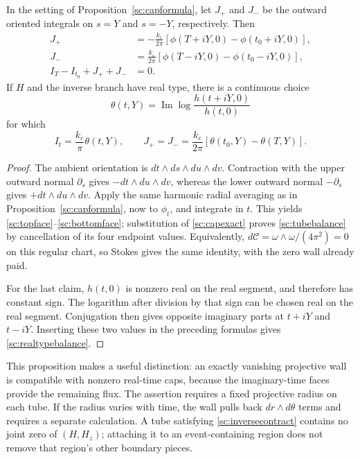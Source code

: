 \begin{proposition}
\label{sc:closedtube}
In the setting of Proposition~\ref{sc:capformula}, let $J_+$ and $J_-$
be the outward oriented integrals on $s=Y$ and $s=-Y$, respectively.
Then
\begin{align}
 J_+&=-\frac{k_\varepsilon}{2\pi}
       [\phi(T+iY,0)-\phi(t_0+iY,0)],
 \label{sc:topface}\\
 J_-&=\frac{k_\varepsilon}{2\pi}
       [\phi(T-iY,0)-\phi(t_0-iY,0)],
 \label{sc:bottomface}\\
 I_T-I_{t_0}+J_++J_-&=0.
 \label{sc:tubebalance}
\end{align}
If $H$ and the inverse branch have real type, there is a continuous
choice
\[
 \theta(t,Y)=\operatorname{Im}\log
          \frac{h(t+iY,0)}{h(t,0)}
\]
for which
\begin{equation}
 I_t=\frac{k_\varepsilon}{\pi}\theta(t,Y),\qquad
 J_+=J_-=\frac{k_\varepsilon}{2\pi}
           [\theta(t_0,Y)-\theta(T,Y)].
 \label{sc:realtypebalance}
\end{equation}
\end{proposition}

\begin{proof}
The ambient orientation is $dt\wedge ds\wedge du\wedge dv$.
Contraction with the upper outward normal $\partial_s$ gives
$-dt\wedge du\wedge dv$, whereas the lower outward normal
$-\partial_s$ gives $+dt\wedge du\wedge dv$. Apply the same harmonic
radial averaging as in Proposition~\ref{sc:capformula}, now to
$\phi_t$, and integrate in $t$. This yields
\eqref{sc:topface}--\eqref{sc:bottomface}; substitution of
\eqref{sc:capexact} proves \eqref{sc:tubebalance} by cancellation of
its four endpoint values. Equivalently,
$d\mathcal C=\omega\wedge\omega/(4\pi^2)=0$ on this regular chart,
so Stokes gives the same identity, with the zero wall already paid.

For the last claim, $h(t,0)$ is nonzero real on the real segment, and
therefore has constant sign. The logarithm after division by that sign
can be chosen real on the real segment. Conjugation then gives opposite
imaginary parts at $t+iY$ and $t-iY$. Inserting these two values in the
preceding formulas gives \eqref{sc:realtypebalance}.
\end{proof}

This proposition makes a useful distinction: an exactly vanishing
projective wall is compatible with nonzero real-time caps, because the
imaginary-time faces provide the remaining flux. The assertion requires
a fixed projective radius on each tube. If the radius varies with time,
the wall pulls back $dr\wedge d\theta$ terms and requires a separate
calculation. A tube satisfying \eqref{sc:inversecontract} contains no
joint zero of $(H,H_z)$; attaching it to an event-containing region does
not remove that region's other boundary pieces.


